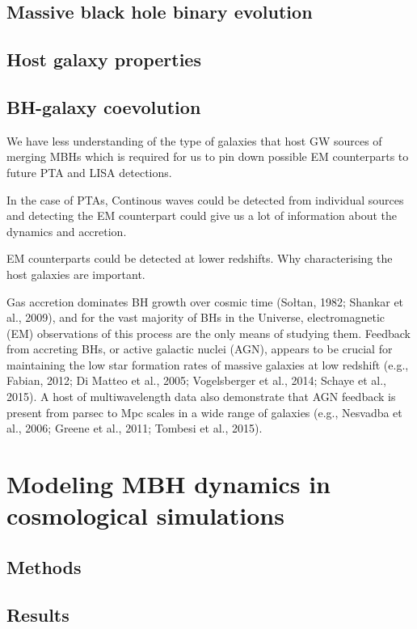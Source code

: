 \documentclass[11pt, letterpaper]{article}
\begin{document}
\subsection{Massive black hole binary evolution}

\subsection{Host galaxy properties}

\subsection{BH-galaxy coevolution}

We have less understanding of the type of galaxies that host GW sources of merging MBHs which is required for us to pin down possible EM counterparts to future PTA and LISA detections.

In the case of PTAs, Continous waves could be detected from individual sources and detecting the EM counterpart could give us a lot of information about the dynamics and accretion. 

EM counterparts could be detected at lower redshifts. Why characterising the host galaxies are important.


Gas accretion dominates BH growth over cosmic time (Sołtan, 1982; Shankar et al., 2009), and for the vast majority of BHs in the Universe, electromagnetic (EM) observations of this process are the only means of studying them. Feedback from accreting BHs, or active galactic nuclei (AGN), appears to be crucial for maintaining the low star formation rates of massive galaxies at low redshift (e.g., Fabian, 2012; Di Matteo et al., 2005; Vogelsberger et al., 2014; Schaye et al., 2015). A host of multiwavelength data also demonstrate that AGN feedback is present from parsec to Mpc scales in a wide range of galaxies (e.g., Nesvadba et al., 2006; Greene et al., 2011; Tombesi et al., 2015).




\section{Modeling MBH dynamics in cosmological simulations}

\subsection{Methods}

\subsection{Results}
\end{document}
